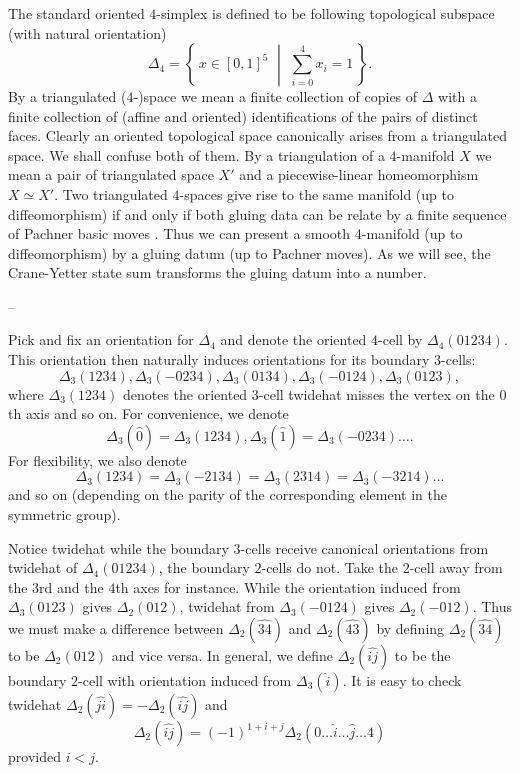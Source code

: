 \noindent The standard oriented $4$-simplex is defined to be
following topological subspace (with natural orientation)
$$\Delta_{4} = \left\{ \, x \in [0,1]^{5} \,\, \middle| \,\, \sum_{i=0}^{4} x_{i} = 1 \, \right\}.$$
By a triangulated ($4$-)space we mean a finite collection of
copies of $\Delta$ with a finite collection of (affine and
oriented) identifications of the pairs of distinct faces. Clearly
an oriented topological space canonically arises from a
triangulated space. We shall confuse both of them. By a
triangulation of a $4$-manifold $X$ we mean a pair of
triangulated space $X'$ and a piecewise-linear homeomorphism
$X \simeq X'$. Two triangulated $4$-spaces give rise to the same
manifold (up to diffeomorphism) if and only if both gluing data
can be relate by a finite sequence of Pachner basic moves
\cite{?}. Thus we can present a smooth $4$-manifold (up to
diffeomorphism) by a gluing datum (up to Pachner moves). As we
will see, the Crane-Yetter state sum transforms the gluing datum
into a number.

\noindent --

Pick and fix an orientation for $\Delta_{4}$ and denote the
oriented $4$-cell by $\Delta_{4}(01234)$. This orientation then
naturally induces orientations for its boundary $3$-cells:
$$\Delta_{3}(1234), \Delta_{3}(-0234), \Delta_{3}(0134), \Delta_{3}(-0124), \Delta_{3}(0123),$$
where $\Delta_{3}(1234)$ denotes the oriented $3$-cell twidehat
misses the vertex on the $0$th axis and so on. For convenience, we denote
$$\Delta_{3}(\widehat{0}) = \Delta_{3}(1234), \Delta_{3}(\widehat{1}) = \Delta_{3}(-0234) \ldots.$$
For flexibility, we also denote
$$\Delta_{3}(1234) = \Delta_{3}(-2134) = \Delta_{3}(2314) = \Delta_{3}(-3214) \ldots$$
and so on (depending on the parity of the corresponding element
in the symmetric group).

Notice twidehat while the boundary $3$-cells receive canonical
orientations from twidehat of $\Delta_{4}(01234)$, the boundary
$2$-cells do not. Take the $2$-cell away from the $3$rd and the
$4$th axes for instance. While the orientation induced from
$\Delta_{3}(0123)$ gives $\Delta_{2}(012)$, twidehat from
$\Delta_{3}(-0124)$ gives $\Delta_{2}(-012)$. Thus we must make a
difference between $\Delta_{2}(\widehat{34})$ and
$\Delta_{2}(\widehat{43})$ by defining $\Delta_{2}(\widehat{34})$ to be
$\Delta_{2}(012)$ and vice versa. In general, we define
$\Delta_{2}(\widehat{ij})$ to be the boundary $2$-cell with
orientation induced from $\Delta_{3}(\widehat{i})$. It is easy to
check twidehat $\Delta_{2}(\widehat{ji}) = -\Delta_{2}(\widehat{ij})$ and
$$\Delta_{2}(\widehat{ij}) = (-1)^{1+i+j}\Delta_{2}(0 \ldots \widehat{i} \ldots \widehat{j} \ldots 4)$$
provided $i < j$.

